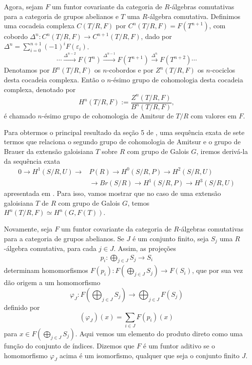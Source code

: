 Agora, sejam $F$ um funtor covariante da categoria de $R$-álgebras comutativas para a categoria de grupos abelianos e $T$ uma $R$-álgebra comutativa. Definimos uma cocadeia complexa $C(T/R, F)$ por $C^n(T/R, F) = F(T^{n+1})$, com cobordo $\Delta^n: C^n(T/R, F) \rightarrow C^{n+1}(T/R, F)$, dado por $\Delta^n = \sum_{i=0}^{n+1}(-1)^i F(\varepsilon_i)$.
\[\cdots \xrightarrow{\Delta^{n-2}} F(T^{n}) \xrightarrow{\Delta^{n-1}} F(T^{n+1}) \xrightarrow{\Delta^n} F(T^{n+2}) \cdots\]
Denotamos por $B^n(T/R, F)$ os $n$-cobordos e por $Z^n(T/R, F)$ os $n$-cociclos desta cocadeia complexa. Então o $n$-ésimo grupo de cohomologia desta cocadeia complexa, denotado por \[H^n(T/R,F):= \dfrac{Z^n(T/R, F)}{B^n(T/R, F)},\] é chamado $n$-ésimo grupo de cohomologia de Amitsur de $T/R$ com valores em $F$. \par 
Para obtermos o principal resultado da seção 5 de \cite{chr}, uma sequência exata de sete termos que relaciona o segundo grupo de cohomologia de Amitsur e o grupo de Brauer da extensão galoisiana $T$ sobre $R$ com grupo de Galois $G$, iremos derivá-la da sequência exata 
\begin{equation} \begin{split} \label{seq:amitsur}
    0 \rightarrow H^1(S/R,U) \rightarrow &P(R) \rightarrow H^0(S/R,P) \rightarrow H^2(S/R,U) \\
    &\rightarrow Br(S/R) \rightarrow H^1(S/R, P)\rightarrow H^3(S/R, U)
\end{split} \end{equation}
apresentada em \cite{amitsur}. Para isso, vamos mostrar que no caso de uma extensão galoisiana $T$ de $R$ com grupo de Galois $G$, temos $H^n(T/R,F) \simeq H^n(G,F(T))$. \par 
Novamente, seja $F$ um funtor covariante da categoria de $R$-álgebras comutativas para a categoria de grupos abelianos. Se $J$ é um conjunto finito, seja $S_j$ uma $R$-álgebra comutativa, para cada $j\in J$. Assim, as projeções
\begin{align*}
    p_i: \bigoplus_{j \in J} S_j \rightarrow S_i
\end{align*}
determinam homomorfismos $F(p_i):F\left(\bigoplus_{j\in J} S_j\right)\rightarrow F\left(S_i\right)$, que por sua vez dão origem a um homomorfismo \[\varphi_J: F\left(\bigoplus_{j\in J}S_j\right) \rightarrow \bigoplus_{j\in J} F\left(S_j\right)\] definido por \[(\varphi_J)(x) = \sum_{i \in J}F(p_i)(x)\] para $x \in F\left(\bigoplus_{j\in J}S_j\right)$. Aqui vemos um elemento do produto direto como uma função do conjunto de índices. Dizemos que $F$ é um funtor aditivo se o homomorfismo $\varphi_J$ acima é um isomorfismo, qualquer que seja o conjunto finito $J$. \par 
